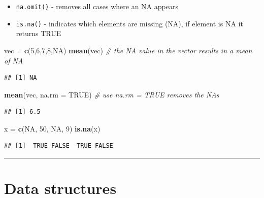 \documentclass[
]{article}
\newenvironment{Shaded}{\begin{snugshade}}{\end{snugshade}}
\newcommand{\CommentTok}[1]{\textcolor[rgb]{0.56,0.35,0.01}{\textit{#1}}}
\newcommand{\DataTypeTok}[1]{\textcolor[rgb]{0.13,0.29,0.53}{#1}}
\newcommand{\DecValTok}[1]{\textcolor[rgb]{0.00,0.00,0.81}{#1}}
\newcommand{\KeywordTok}[1]{\textcolor[rgb]{0.13,0.29,0.53}{\textbf{#1}}}
\newcommand{\NormalTok}[1]{#1}
\newcommand{\OtherTok}[1]{\textcolor[rgb]{0.56,0.35,0.01}{#1}}
\newcommand{\StringTok}[1]{\textcolor[rgb]{0.31,0.60,0.02}{#1}}
\providecommand{\tightlist}{%
  \setlength{\itemsep}{0pt}\setlength{\parskip}{0pt}}
\begin{document}
\begin{itemize}
\tightlist
\item
  \texttt{na.omit()} - removes all cases where an NA appears
\item
  \texttt{is.na()} - indicates which elements are missing (NA), if
  element is NA it returns TRUE
\end{itemize}

\begin{Shaded}
\begin{Highlighting}[]
\NormalTok{vec =}\StringTok{ }\KeywordTok{c}\NormalTok{(}\DecValTok{5}\NormalTok{,}\DecValTok{6}\NormalTok{,}\DecValTok{7}\NormalTok{,}\DecValTok{8}\NormalTok{,}\OtherTok{NA}\NormalTok{)  }
\KeywordTok{mean}\NormalTok{(vec) }\CommentTok{# the NA value in the vector results in a mean of NA}
\end{Highlighting}
\end{Shaded}

\begin{verbatim}
## [1] NA
\end{verbatim}

\begin{Shaded}
\begin{Highlighting}[]
\KeywordTok{mean}\NormalTok{(vec, }\DataTypeTok{na.rm =} \OtherTok{TRUE}\NormalTok{) }\CommentTok{# use na.rm = TRUE removes the NAs }
\end{Highlighting}
\end{Shaded}

\begin{verbatim}
## [1] 6.5
\end{verbatim}

\begin{Shaded}
\begin{Highlighting}[]
\NormalTok{x =}\StringTok{ }\KeywordTok{c}\NormalTok{(}\OtherTok{NA}\NormalTok{, }\DecValTok{50}\NormalTok{, }\OtherTok{NA}\NormalTok{, }\DecValTok{9}\NormalTok{)}
\KeywordTok{is.na}\NormalTok{(x) }
\end{Highlighting}
\end{Shaded}

\begin{verbatim}
## [1]  TRUE FALSE  TRUE FALSE
\end{verbatim}

\begin{center}\rule{0.5\linewidth}{0.5pt}\end{center}

\hypertarget{data-structures}{%
\section{\texorpdfstring{\textbf{Data
structures}}{Data structures}}\label{data-structures}}
\end{document}
